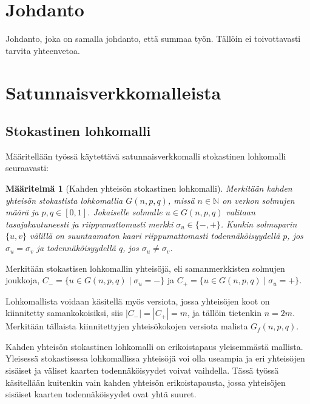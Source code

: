 \documentclass[finnish,12pt,a4paper,pdftex,sci,utf8]{aaltothesis}
\newtheorem{definition}{Määritelmä}
\begin{document}
\section{Johdanto}
Johdanto, joka on samalla johdanto, että summaa työn. Tällöin ei toivottavasti tarvita yhteenvetoa.
\thispagestyle{empty}

\clearpage

\section{Satunnaisverkkomalleista}

\subsection{Stokastinen lohkomalli}
Määritellään työssä käytettävä satunnaisverkkomalli stokastinen lohkomalli seuraavasti:

\begin{definition}[Kahden yhteisön stokastinen lohkomalli]
	Merkitään kahden yhteisön stokastista lohkomallia $G(n,p,q)$, missä $n \in \mathbb{N}$ on verkon solmujen määrä ja $p,q \in [0,1]$.  Jokaiselle solmulle $u \in G(n,p,q)$ valitaan tasajakautuneesti ja riippumattomasti merkki $\sigma_u \in \{-, +\}$. Kunkin solmuparin $\{u,v\}$ välillä on suuntaamaton kaari riippumattomasti todennäköisyydellä $p$, jos $\sigma_u = \sigma_v$ ja todennäköisyydellä $q$, jos $\sigma_u \neq \sigma_v$.
\end{definition}

Merkitään stokastisen lohkomallin yhteisöjä, eli samanmerkkisten solmujen joukkoja, $C_- = \{u \in G(n,p,q) \mid \sigma_u = -\}$ ja $C_+ = \{u \in G(n,p,q) \mid \sigma_u = +\}$.

Lohkomallista voidaan käsitellä myös versiota, jossa yhteisöjen koot on kiinnitetty samankokoisiksi, siis $|C_-| = |C_+| = m$, ja tällöin tietenkin $n = 2m$. Merkitään tällaista kiinnitettyjen yhteisökokojen versiota malista $G_f(n,p,q)$.

Kahden yhteisön stokastinen lohkomalli on erikoistapaus yleisemmästä mallista. Yleisessä stokastisessa lohkomallissa yhteisöjä voi olla useampia ja eri yhteisöjen sisäiset ja väliset kaarten todennäköisyydet voivat vaihdella. Tässä työssä käsitellään kuitenkin vain kahden yhteisön erikoistapausta, jossa yhteisöjen sisäiset kaarten todennäköisyydet ovat yhtä suuret.
\end{document}
